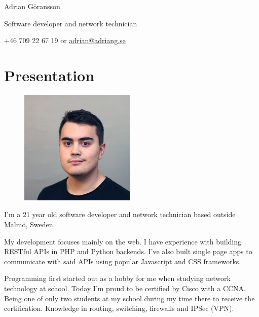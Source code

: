 \documentclass[a4paper, 11pt]{article}
\begin{document}
\chead{}
\rhead{\today}
\cfoot{}
\rfoot{\thepage}
\renewcommand{\headrulewidth}{0.4pt}
\renewcommand{\footrulewidth}{0.4pt}

    \begin{center}
        \begin{Huge}
            Adrian Göransson
        \end{Huge}

        \begin{large}
            Software developer and network technician
        \end{large}

        +46 709 22 67 19 or \href{mailto:adrian@adriang.se}{adrian@adriang.se}
    \end{center}

    \section*{Presentation}

        \begin{figure}\centering
            \includegraphics[width=5.5cm]{profile.jpg}
        \end{figure}

        I'm a 21 year old software developer and network technician based outside Malmö, Sweden.

        My development focuses mainly on the web.
        I have experience with building RESTful APIs in PHP and Python backends.
        I've also built single page apps to communicate with said APIs using popular Javascript and CSS frameworks.

        Programming first started out as a hobby for me when studying network technology at school.
        Today I'm proud to be certified by Cisco with a CCNA.
        Being one of only two students at my school during my time there to receive the certification.
        Knowledge in routing, switching, firewalls and IPSec (VPN).
\end{document}
